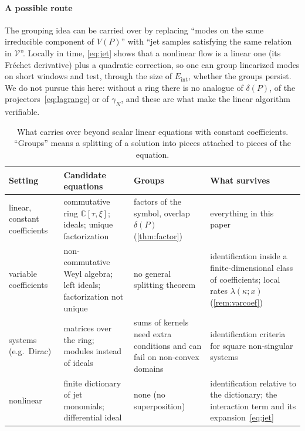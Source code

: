 \documentclass[11pt]{article}
\theoremstyle{plain}
\theoremstyle{definition}
\theoremstyle{remark}
\newcommand{\C}{\mathbb{C}}
\newcommand{\Var}{V}                        %
\newcommand{\Eint}{E_{\mathrm{int}}}        %
\newcommand{\gN}{\gamma_{N}}                %
\newcommand{\deltaP}{\delta(P)}             %
\begin{document}
\paragraph{A possible route} The grouping idea can be carried over by replacing ``modes on the same
irreducible component of $\Var(P)$'' with ``jet samples satisfying the same relation in $\mathcal V$''. Locally
in time, \eqref{eq:jet} shows that a nonlinear flow is a linear one (its Fr\'echet derivative) plus a
quadratic correction, so one can group linearized modes on short windows and test, through the size
of $\Eint$, whether the groups persist. We do not pursue this here: without a ring there is no
analogue of $\deltaP$, of the projectors~\eqref{eq:lagrange} or of $\gN$, and these are what make the
linear algorithm verifiable.

\begin{table}[tbp]
\centering\small
\caption{What carries over beyond scalar linear equations with constant coefficients. ``Groups'' means a splitting of
a solution into pieces attached to pieces of the equation.}\label{tab:beyond}
\begin{tabularx}{\linewidth}{@{}>{\raggedright\arraybackslash}p{2.3cm}>{\raggedright\arraybackslash}X>{\raggedright\arraybackslash}X>{\raggedright\arraybackslash}X@{}}
\toprule
Setting & Candidate equations & Groups & What survives\\
\midrule
linear, constant coefficients & commutative ring $\C[\tau,\xi]$; ideals; unique factorization & factors of the symbol, overlap $\deltaP$ (\cref{thm:factor}) & everything in this paper\\
variable coefficients & non-commutative Weyl algebra; left ideals; factorization not unique & no general splitting theorem & identification inside a finite-dimensional class of coefficients; local rates $\lambda(\kappa;x)$ (\cref{rem:varcoef})\\
systems (e.g.\ Dirac) & matrices over the ring; modules instead of ideals & sums of kernels need extra conditions and can fail on non-convex domains & identification criteria for square non-singular systems\\
nonlinear & finite dictionary of jet monomials; differential ideal & none (no superposition) & identification relative to the dictionary; the interaction term and its expansion~\eqref{eq:jet}\\
\bottomrule
\end{tabularx}
\end{table}

\end{document}
